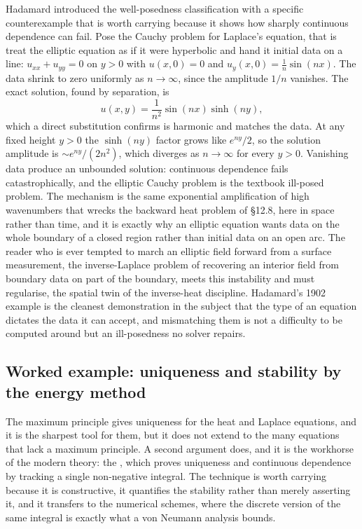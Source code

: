 \begin{mastery}
Hadamard introduced the well-posedness classification with a
specific counterexample that is worth carrying because it shows how
sharply continuous dependence can fail. Pose the Cauchy problem for
Laplace's equation, that is treat the elliptic equation as if it
were hyperbolic and hand it initial data on a line: $u_{xx} + u_{yy}
= 0$ on $y > 0$ with $u(x, 0) = 0$ and $u_{y}(x, 0) = \tfrac{1}{n}
\sin(nx)$. The data shrink to zero uniformly as $n \to \infty$,
since the amplitude $1/n$ vanishes. The exact solution, found by
separation, is
\[
u(x, y) = \frac{1}{n^{2}}\sin(nx)\sinh(ny),
\]
which a direct substitution confirms is harmonic and matches the
data. At any fixed height $y > 0$ the $\sinh(ny)$ factor grows like
$e^{ny}/2$, so the solution amplitude is $\sim e^{ny}/(2n^{2})$,
which diverges as $n \to \infty$ for every $y > 0$. Vanishing data
produce an unbounded solution: continuous dependence fails
catastrophically, and the elliptic Cauchy problem is the textbook
ill-posed problem. The mechanism is the same exponential
amplification of high wavenumbers that wrecks the backward heat
problem of §12.8, here in space rather than time, and it is exactly
why an elliptic equation wants data on the whole boundary of a
closed region rather than initial data on an open arc. The reader
who is ever tempted to march an elliptic field forward from a
surface measurement, the inverse-Laplace problem of recovering an
interior field from boundary data on part of the boundary, meets
this instability and must regularise, the spatial twin of the
inverse-heat discipline. Hadamard's 1902 example is the cleanest
demonstration in the subject that the type of an equation dictates
the data it can accept, and mismatching them is not a difficulty to
be computed around but an ill-posedness no solver repairs.
\end{mastery}

\subsection{Worked example: uniqueness and stability by the energy method}

The maximum principle gives uniqueness for the heat and Laplace
equations, and it is the sharpest tool for them, but it does not
extend to the many equations that lack a maximum principle. A second
argument does, and it is the workhorse of the modern theory: the
, which proves uniqueness and continuous
dependence by tracking a single non-negative integral. The technique
is worth carrying because it is constructive, it quantifies the
stability rather than merely asserting it, and it transfers to the
numerical schemes, where the discrete version of the same integral is
exactly what a von Neumann analysis bounds.

